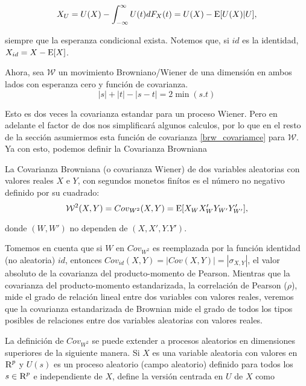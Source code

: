 		$$
		X_U = U(X)-\int_{-\infty}^{\infty}U(t)dF_X(t)=U(X)-\operatorname{E}[U(X)|U],
		$$

		siempre que la esperanza condicional exista. Notemos que, si $id$ es la identidad, $X_{id}=X-\operatorname{E}[X]$. 

		Ahora, sea $\mathcal{W}$ un movimiento Browniano/Wiener de una dimensi\'on en ambos lados con esperanza cero y funci\'on de covarianza.
		\begin{equation}\label{brw_covariamce}
			|s|+|t|-|s-t|=2\min(s.t)
		\end{equation}
			

		Esto es dos veces la covarianza estandar para un proceso Wiener. Pero en adelante el factor de dos nos simplificar\'a algunos calculos, por lo que en el resto de la secci\'on asumiermos esta funci\'on de covarianza \ref{brw_covariamce} para $\mathcal{W}$. Ya con esto, podemos definir la Covarianza Browniana 

		\begin{defn}
			La Covarianza Browniana (o covarianza Wiener) de dos variables aleatorias con valores reales $X$ e $Y$, con segundos monetos fin\'itos es el n\'umero no negativo definido por su cuadrado:
			\begin{equation}\label{brw_cov}
				\mathcal{W}^2(X,Y)={Cov}_{{W}^2}(X,Y)=\operatorname{E}[X_{W}X'_{W}Y_{W'}Y'_{W'}],
			\end{equation}

			donde $({W},{W'})$ no dependen de $(X,X',Y.Y')$.
		\end{defn}

		Tomemos en cuenta que si ${W}$ en ${Cov}_{{W}^2}$ es reemplazada por la funci\'on identidad (no aleatoria) $id$, entonces ${Cov}_{id}(X, Y) = |{Cov}(X, Y)| = |\sigma_{X,Y}|$, el valor absoluto de la covarianza del producto-momento de Pearson. Mientras que la covarianza del producto-momento estandarizada, la correlación de Pearson ($\rho$), mide el grado de relaci\'on lineal entre dos variables con valores reales, veremos que la covarianza estandarizada de Brownian mide el grado de todos los tipos posibles de relaciones entre dos variables aleatorias con valores reales.

		La definición de ${Cov}_{{W}^2}$ se puede extender a procesos aleatorios en dimensiones superiores de la siguiente manera. Si $X$ es una variable aleatoria con valores en $\textsc{R}^p$ y $U(s)$ es un proceso aleatorio (campo aleatorio) definido para todos los $s \in \textsc{R}^p$ e independiente de $X$, define la versión centrada en $U$ de $X$ como

